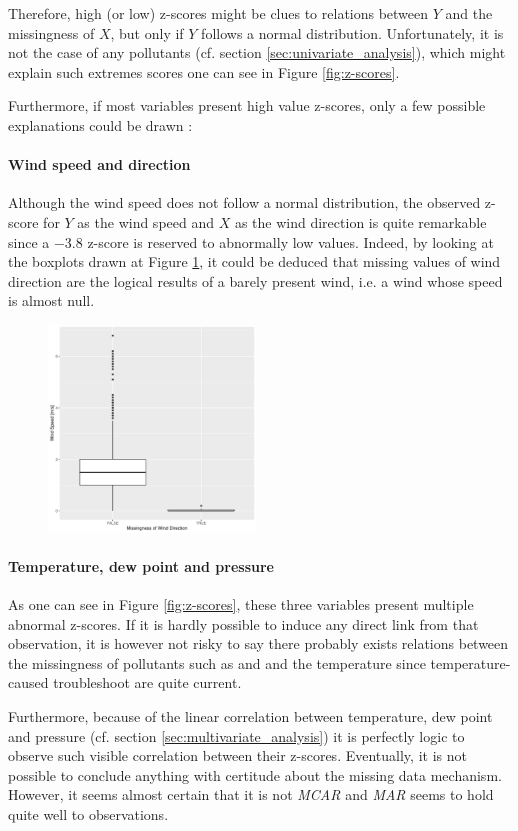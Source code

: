 \documentclass[a4paper, 12pt]{article}
\begin{document}
	Therefore, high (or low) z-scores might be clues to relations between $Y$ and the missingness of $X$, but only if $Y$ follows a normal distribution. Unfortunately, it is not the case of any pollutants (cf. section \ref{sec:univariate_analysis}), which might explain such extremes scores one can see in Figure \ref{fig:z-scores}. \par
	Furthermore, if most variables present high value z-scores, only a few possible explanations could be drawn :
    \paragraph{Wind speed and direction} Although the wind speed does not follow a normal distribution, the observed z-score for $Y$ as the wind speed and $X$ as the wind direction is quite remarkable since a \num{-3.8} z-score is reserved to abnormally low values. Indeed, by looking at the boxplots drawn at Figure \ref{fig:wspd_wdir_missingness.pdf}, it could be deduced that missing values of wind direction are the logical results of a barely present wind, i.e. a wind whose speed is almost null.
    \begin{figure}
        \vspace{-1em}
	    \centering
	    \includegraphics[width=0.49\textwidth]{resources/pdf/wspd_wdirmiss.pdf}
	    \label{fig:wspd_wdir_missingness.pdf}
	    \vspace{-0em}
    \end{figure}
    \paragraph{Temperature, dew point and pressure} As one can see in Figure \ref{fig:z-scores}, these three variables present multiple abnormal z-scores. If it is hardly possible to induce any direct link from that observation, it is however not risky to say there probably exists relations between the missingness of pollutants such as  and  and the temperature since temperature-caused troubleshoot are quite current. \par
    Furthermore, because of the linear correlation between temperature, dew point and pressure (cf. section \ref{sec:multivariate_analysis}) it is perfectly logic to observe such visible correlation between their z-scores.
	Eventually, it is not possible to conclude anything with certitude about the missing data mechanism. However, it seems almost certain that it is not \emph{MCAR} and \emph{MAR} seems to hold quite well to observations.
\end{document}
